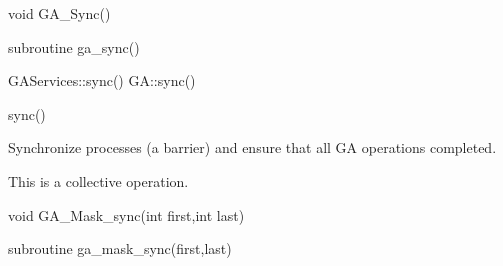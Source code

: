 \documentclass[12pt]{article}
\begin{document}

\begin{capi}
\begin{ccode}
void GA_Sync()
\end{ccode}
\end{capi}

\begin{fapi}
\begin{fcode}
subroutine ga_sync()
\end{fcode}
\end{fapi}

\begin{cxxapi}
\begin{cxxcode}
GAServices::sync()
GA::sync()
\end{cxxcode}
\end{cxxapi}

\begin{pyapi}
\begin{pycode}
sync()
\end{pycode}
\end{pyapi}

\begin{desc}

Synchronize processes (a barrier) and ensure that all GA operations completed.

This is a collective operation.

\end{desc}


\begin{capi}
\begin{ccode}
void GA_Mask_sync(int first,int last)
\end{ccode}
\begin{funcargs}
\end{funcargs}
\end{capi}

\begin{fapi}
\begin{fcode}
subroutine ga_mask_sync(first,last)
\end{fcode}
\begin{funcargs}
\end{funcargs}
\end{fapi}
\end{document}

